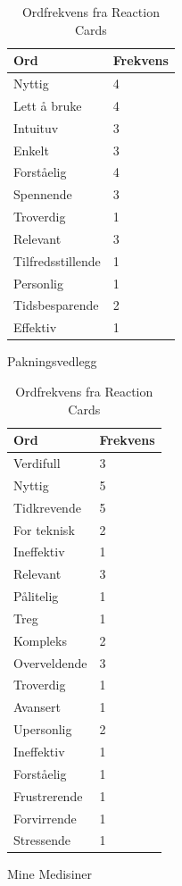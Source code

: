 \begin{table}
	\centering
	\begin{subtable}[b]{2in}
		\centering
    \begin{tabular}{ | p{2.5cm} | p{1.7cm} | }
      \hline
       \textbf{Ord} & \textbf{Frekvens} \\ \hline
        Nyttig			&		4\\ \hline
        Lett å bruke	&		4\\ \hline
        Intuituv		&	    3\\ \hline
        Enkelt			&		3\\ \hline
        Forståelig		&		4\\ \hline
        Spennende		&		3\\ \hline
        Troverdig		&		1\\ \hline
        Relevant		&		3\\ \hline
        Tilfredsstillende	&	1\\ \hline
        Personlig			&	1\\ \hline
        Tidsbesparende		&	2\\ \hline
        Effektiv			&	1\\ \hline
    \end{tabular}
    \caption{Pakningsvedlegg}
    \label{tab:reactionPak}
	\end{subtable}
	\quad
	\begin{subtable}[b]{2in}
		\centering
    \begin{tabular}{ | p{2.5cm} | p{1.7cm} | }
      \hline
       \textbf{Ord} & \textbf{Frekvens} \\ \hline
        Verdifull			&		3 \\ \hline
        Nyttig				&   	5\\ \hline
        Tidkrevende			&		5\\ \hline
        For teknisk			&		2\\ \hline
        Ineffektiv			&		1\\ \hline
        Relevant			&		3\\ \hline
        Pålitelig			&		1\\ \hline
        Treg				&   	1\\ \hline
        Kompleks			&		2\\ \hline
        Overveldende		&		3\\ \hline
        Troverdig			&		1\\ \hline
        Avansert			&		1\\ \hline
        Upersonlig			&		2\\ \hline
        Ineffektiv			&		1\\ \hline
        Forståelig			&		1\\ \hline
        Frustrerende		&		1\\ \hline
        Forvirrende			&		1\\ \hline
        Stressende			&		1\\ \hline
    \end{tabular}
    \caption{Mine Medisiner}
    \label{tab:reactionMed}
    \end{subtable}
    \caption{Ordfrekvens fra Reaction Cards}\label{table:Ordsky}
\end{table}